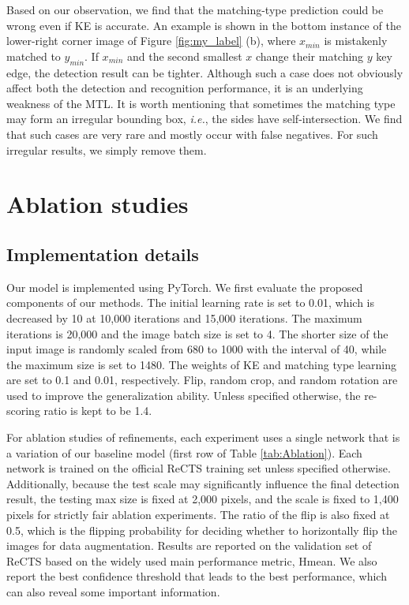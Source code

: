 Based on our observation, we find that the matching-type prediction could be wrong even if KE is accurate. An example is shown in the bottom instance of the lower-right corner image of Figure \ref{fig:my_label} (b), where $x_{min}$ is mistakenly matched to $y_{min}$. If $x_{min}$ and the second smallest $x$ change their matching $y$ key edge, the detection result can be tighter. Although such a case does not obviously affect both the detection and recognition performance, it is an underlying weakness of the MTL. It is worth mentioning that sometimes the matching type may form an irregular bounding box, \textit{i.e.}, the sides have self-intersection. We find that such cases are very 
rare
and mostly occur with false negatives. For such irregular results, we simply remove  them.


\section{Ablation studies}
\subsection{Implementation details}
Our model is implemented using PyTorch. We first evaluate the proposed components of our methods. The initial learning rate is set to 0.01, which is decreased by 10 at 10,000 iterations and 15,000 iterations. The maximum iterations is 20,000 and the image batch size is set to 4. The shorter size of the input image is randomly scaled from 680 to 1000 with the interval of 40, while the maximum size is set to 1480. The weights of KE and matching type learning are set to 0.1 and 0.01, respectively. Flip, random crop, and random rotation are used to improve the generalization ability. Unless specified otherwise, 
the re-scoring ratio is kept to be 1.4. 



For ablation studies of refinements, each experiment uses
a single network that is
a variation of our baseline model (first row of Table \ref{tab:Ablation}). Each network is
trained on the official ReCTS training set unless specified otherwise. Additionally, because the test scale may significantly influence the final detection result, the testing max size is
fixed at 2,000 pixels, and the scale 
is
fixed to 1,400 pixels for strictly fair ablation experiments. The ratio of the flip is
also fixed at 0.5, which is the flipping probability for deciding whether to horizontally flip the images for data augmentation. Results are reported on the validation set of ReCTS based on the widely used main performance metric, Hmean. We also report the best confidence threshold that leads to the best performance, which can also reveal some important information.

